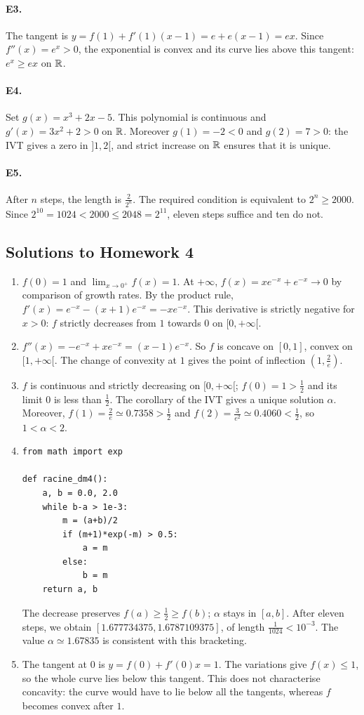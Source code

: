 \paragraph{E3.}The tangent is $y=f(1)+f'(1)(x-1)=e+e(x-1)=ex$. Since $f''(x)=e^x>0$, the exponential is convex and its curve lies above this tangent: $e^x\ge ex$ on $\mathbb R$.

\paragraph{E4.}Set $g(x)=x^3+2x-5$. This polynomial is continuous and $g'(x)=3x^2+2>0$ on $\mathbb R$. Moreover $g(1)=-2<0$ and $g(2)=7>0$: the IVT gives a zero in $]1,2[$, and strict increase on $\mathbb R$ ensures that it is unique.

\paragraph{E5.}After $n$ steps, the length is $\frac{2}{2^n}$. The required condition is equivalent to $2^n\ge2000$. Since $2^{10}=1024<2000\le2048=2^{11}$, eleven steps suffice and ten do not.

\subsection{Solutions to Homework 4}\begin{enumerate}
\item $f(0)=1$ and $\lim_{x\to0^+}f(x)=1$. At $+\infty$, $f(x)=xe^{-x}+e^{-x}\to0$ by comparison of growth rates. By the product rule, $f'(x)=e^{-x}-(x+1)e^{-x}=-xe^{-x}$. This derivative is strictly negative for $x>0$: $f$ strictly decreases from $1$ towards $0$ on $[0,+\infty[$.
\item $f''(x)=-e^{-x}+xe^{-x}=(x-1)e^{-x}$. So $f$ is concave on $[0,1]$, convex on $[1,+\infty[$. The change of convexity at $1$ gives the point of inflection $(1,\frac{2}{e})$.
\item $f$ is continuous and strictly decreasing on $[0,+\infty[$; $f(0)=1>\frac{1}{2}$ and its limit $0$ is less than $\frac{1}{2}$. The corollary of the IVT gives a unique solution $\alpha$. Moreover, $f(1)=\frac{2}{e}\simeq0.7358>\frac{1}{2}$ and $f(2)=\frac{3}{e^2}\simeq0.4060<\frac{1}{2}$, so $1<\alpha<2$.
\item 
\begin{lstlisting}
from math import exp

def racine_dm4():
    a, b = 0.0, 2.0
    while b-a > 1e-3:
        m = (a+b)/2
        if (m+1)*exp(-m) > 0.5:
            a = m
        else:
            b = m
    return a, b
\end{lstlisting}
The decrease preserves $f(a)\ge\frac{1}{2}\ge f(b)$; $\alpha$ stays in $[a,b]$. After eleven steps, we obtain $[1.677734375,1.6787109375]$, of length $\frac{1}{1024}<10^{-3}$. The value $\alpha\simeq1.67835$ is consistent with this bracketing.
\item The tangent at $0$ is $y=f(0)+f'(0)x=1$. The variations give $f(x)\le1$, so the whole curve lies below this tangent. This does not characterise concavity: the curve would have to lie below all the tangents, whereas $f$ becomes convex after $1$.
\end{enumerate}

